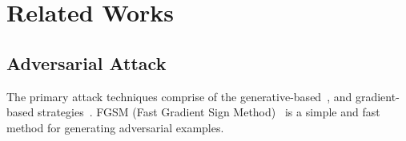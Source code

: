\section{Related Works}
\subsection{Adversarial Attack}

The primary attack techniques comprise of the generative-based~\cite{zhao2018generating,song2018constructing,joshi2019semantic,qiu2020semanticadv,xiao2021improving}, and gradient-based strategies~\cite{goodfellow2014explaining,madry2017towards,dong2018boosting,xie2019improving,dong2019evading,lin2019nesterov}. FGSM (Fast Gradient Sign Method)~\cite{goodfellow2014explaining} is a simple and fast method for generating adversarial examples.



